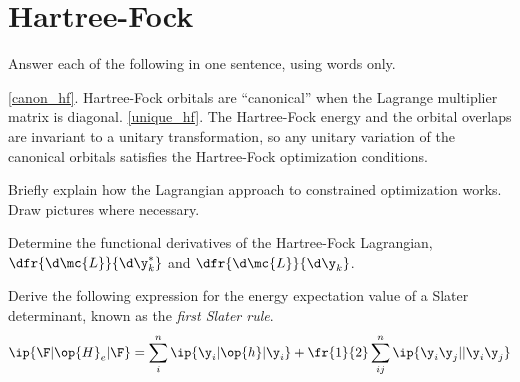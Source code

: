 \chapter{Hartree-Fock}

\begin{Exercise}
    Answer each of the following in one sentence, using words only.
    \label{canon_hf}
    \label{unique_hf}
\end{Exercise}

\begin{Answer}
    \ref{canon_hf}. Hartree-Fock orbitals are ``canonical'' when the Lagrange multiplier matrix is diagonal.
    \ref{unique_hf}. The Hartree-Fock energy and the orbital overlaps are invariant to a unitary transformation, so any unitary variation of the canonical orbitals satisfies the Hartree-Fock optimization conditions.
\end{Answer}

\begin{Exercise}
    Briefly explain how the Lagrangian approach to constrained optimization works. Draw pictures where necessary.
\end{Exercise}

\begin{Exercise}
  Determine the functional derivatives of the Hartree-Fock Lagrangian,
  $\dfr{\d\mc{L}}{\d\y_k^*}$
  and
  $\dfr{\d\mc{L}}{\d\y_k}$.
\end{Exercise}

\begin{Exercise}
    Derive the following expression for the energy expectation value of a Slater determinant, known as the \textit{first Slater rule}.
    \begin{align*}
      \ip{\F|\op{H}_e|\F}
    =
    \sum_{i}^n
      \ip{\y_i|\op{h}|\y_i}
    +\fr{1}{2}\sum_{ij}^n
      \ip{\y_i\y_j||\y_i\y_j}
    \end{align*}
\end{Exercise}
